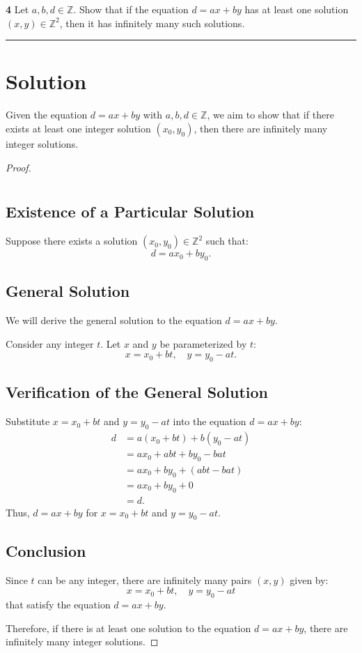 \documentclass[12pt]{amsart}
\theoremstyle{definition}
\numberwithin{equation}{section}
\newcommand{\Z}{\mathbb{Z}}
\begin{document}
\newpage
\begin{exercise}{\textbf{4}} Let \(a,b,d \in \Z\). Show that if the equation \(d = ax+by\) has at least one solution \((x,y) \in \Z^2\), then it has infinitely many such solutions.
    
    \noindent\rule{\linewidth}{1pt}

    \section*{Solution}

Given the equation \(d = ax + by\) with \(a, b, d \in \mathbb{Z}\), we aim to show that if there exists at least one integer solution \((x_0, y_0)\), then there are infinitely many integer solutions.


\begin{proof}\(\)
    \section*{}\vspace*{-20pt}
\subsection*{Existence of a Particular Solution}
Suppose there exists a solution \((x_0, y_0) \in \mathbb{Z}^2\) such that:
\[
d = ax_0 + by_0.
\]

\subsection*{General Solution}
We will derive the general solution to the equation \(d = ax + by\).

Consider any integer \(t\). Let \(x\) and \(y\) be parameterized by \(t\):
\[
x = x_0 + bt, \quad y = y_0 - at.
\]

\subsection*{Verification of the General Solution}
Substitute \(x = x_0 + bt\) and \(y = y_0 - at\) into the equation \(d = ax + by\):
\begin{align*}
d &= a(x_0 + bt) + b(y_0 - at) \\
  &= ax_0 + abt + by_0 - bat \\
  &= ax_0 + by_0 + (abt - bat) \\
  &= ax_0 + by_0 + 0 \\
  &= d.
\end{align*}
Thus, \(d = ax + by\) for \(x = x_0 + bt\) and \(y = y_0 - at\).

\subsection*{Conclusion}
Since \(t\) can be any integer, there are infinitely many pairs \((x, y)\) given by:
\[
x = x_0 + bt, \quad y = y_0 - at
\]
that satisfy the equation \(d = ax + by\).

\noindent Therefore, if there is at least one solution to the equation \(d = ax + by\), there are infinitely many integer solutions.
\end{proof}
\end{exercise}
\end{document}
